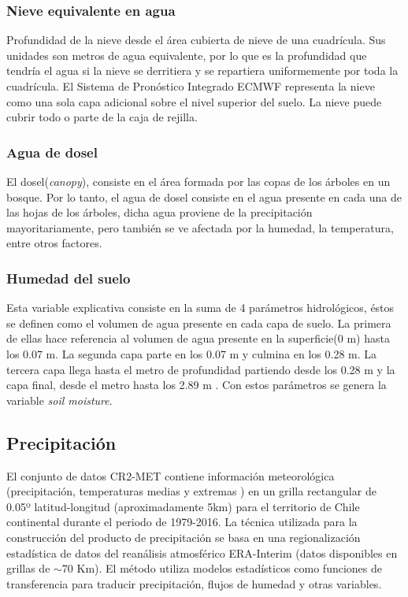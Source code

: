     \subsubsection{Nieve equivalente en agua}
    Profundidad de la nieve desde el área cubierta de nieve de una cuadrícula. Sus unidades son metros de agua equivalente, por lo que es la profundidad que tendría el agua si la nieve se derritiera y se 
    repartiera uniformemente por toda la cuadrícula. El Sistema de Pronóstico Integrado ECMWF representa la nieve como una sola capa adicional sobre el nivel superior del suelo. La nieve puede cubrir todo o parte de la caja de rejilla.

    \subsubsection{Agua de dosel}
    El dosel(\textit{canopy}), consiste en el área formada por las copas de los árboles en un bosque. Por lo tanto, el agua de dosel consiste en el agua presente en cada una de las hojas de los árboles, dicha agua proviene de 
    la precipitación mayoritariamente, pero también se ve afectada por la humedad, la temperatura, entre otros factores.

    \subsubsection{Humedad del suelo}
    Esta variable explicativa consiste en la suma de 4 parámetros hidrológicos, éstos se definen como el volumen de agua presente en cada capa de suelo. La primera de ellas
    hace referencia al volumen de agua presente en la superficie(0 m) hasta los 0.07 m. La segunda capa parte en los 0.07 m y culmina en los 0.28 m. La tercera capa llega hasta el metro de profundidad partiendo desde los 0.28 m
    y la capa final, desde el metro hasta los 2.89 m \cite{ERA5-L_doc}. Con estos parámetros se genera la variable \textit{soil moisture}.

    \subsection{Precipitación}
    El conjunto de datos CR2-MET contiene información meteorológica (precipitación, temperaturas medias y extremas ) en un grilla rectangular de 0.05º latitud-longitud (aproximadamente 5km) para el territorio de Chile continental 
    durante el periodo de 1979-2016. La técnica utilizada para la construcción del producto de precipitación se basa en una regionalización estadística de datos del reanálisis atmosférico ERA-Interim (datos disponibles en grillas de $\sim$70 Km). 
    El método utiliza modelos estadísticos como funciones de transferencia para traducir precipitación, flujos de humedad y otras variables\cite{pr}.
    
